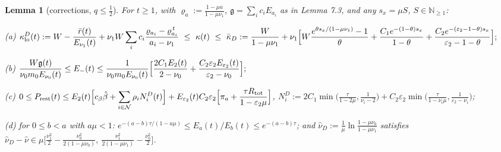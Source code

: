 \documentclass[11pt,a4paper]{article}
\newtheorem{lemma}[theorem]{Lemma}
\theoremstyle{definition}
\theoremstyle{remark}
\begin{document}
\begin{lemma}[{corrections, $q\le\frac12$}]
For $t\ge1$, with $\varrho_a:=\frac{1-\mu a}{1-\mu\nu_1}$, $\mathfrak g=\sum_ic_iE_{a_i}$ as in Lemma 7.3, and any $s_x=\mu S$, $S\in\mathbb N_{\ge1}$:

(a) $\displaystyle \kappa_{\rm lo}^D(t):=W-\frac{\bar r(t)}{E_{\nu_1}(t)}+\nu_1W\sum_ic_i\frac{\varrho_{a_i}-\varrho_{a_i}^{\,t}}{a_i-\nu_1}\ \le\ \kappa(t)\ \le\ \bar\kappa_D:=\frac{W}{1-\mu\nu_1}+\nu_1\Bigl[W\frac{e^{\theta s_x/(1-\mu\nu_1)}-1}{\theta}+\frac{C_1e^{-(1-\theta)s_x}}{1-\theta}+\frac{C_2e^{-(\varepsilon_2-1-\theta)s_x}}{\varepsilon_2-1-\theta}\Bigr];$

(b) $\displaystyle \frac{W\mathfrak g(t)}{\nu_0m_0E_{\nu_0}(t)}\le E_-(t)\le\frac{1}{\nu_0m_0E_{\nu_0}(t)}\Bigl[\frac{2C_1E_2(t)}{2-\nu_0}+\frac{C_2\varepsilon_2E_{\varepsilon_2}(t)}{\varepsilon_2-\nu_0}\Bigr];$

(c) $\displaystyle 0\le P_{\rm rest}(t)\le E_2(t)\Bigl[c_\beta\hat\beta+\sum_{i\in\mathcal N}\rho_iN_i^D(t)\Bigr]+E_{\varepsilon_2}(t)C_2\varepsilon_2\Bigl[\pi_a+\frac{\tau R_{\rm tot}}{1-\varepsilon_2\mu}\Bigr]$, $N_i^D:=2C_1\min\bigl(\frac{\tau}{1-2\mu},\frac{1}{\nu_i-2}\bigr)+C_2\varepsilon_2\min\bigl(\frac{\tau}{1-\nu_i\mu},\frac{1}{\varepsilon_2-\nu_i}\bigr)$;

(d) for $0\le b<a$ with $a\mu<1$: $e^{-(a-b)\tau/(1-a\mu)}\le E_a(t)/E_b(t)\le e^{-(a-b)\tau}$; and $\hat\nu_D:=\frac1\mu\ln\frac{1-\mu\nu_0}{1-\mu\nu_1}$ satisfies $\hat\nu_D-\hat\nu\in\mu\bigl[\frac{\nu_1^2}{2}-\frac{\nu_0^2}{2(1-\mu\nu_0)},\ \frac{\nu_1^2}{2(1-\mu\nu_1)}-\frac{\nu_0^2}{2}\bigr]$.
\end{lemma}
\end{document}
